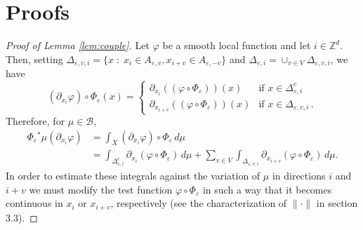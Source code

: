 \documentclass{amsart}
\numberwithin{equation}{section}
\begin{document}
\section{Proofs}\label{sec:proofs}
\begin{proof}[Proof of Lemma \ref{lem:couple}]
  Let ${\varphi}$ be a smooth local function and let $i\in{{\mathbb Z}}^d$.
  Then, setting $\Delta_{{\varepsilon},v,i}=\{x\;:\; x_i\in
  A_{{\varepsilon},v}, x_{i+v}\in A_{{\varepsilon},-v}\}$ and $\Delta_{{\varepsilon},i}=\cup_{v\in V}
  \Delta_{{\varepsilon},v,i}$, we have
  \begin{displaymath}
    ({\partial_{{x_i}}}{\varphi})\circ\Phi_{\varepsilon}(x)=
    \begin{cases}
      {\partial_{{x_i}}}\left(({\varphi}\circ\Phi_{\varepsilon})\right)(x)&\text{if
      }x\in\Delta_{{\varepsilon},i}^c\\
      {\partial_{{x_{i+v}}}}\left(({\varphi}\circ\Phi_{\varepsilon})\right)(x)&\text{if
      }x\in\Delta_{{\varepsilon},v,i} \,.
    \end{cases}
  \end{displaymath}
  Therefore, for $\mu\in {{\mathcal B}}$,
  \begin{equation}
    \label{eq:LY1}
    \begin{split}
      \Phi_{\varepsilon}{^*}\mu({\partial_{{x_i}}}{\varphi}) &=
      \int_X  ({\partial_{{x_i}}}{\varphi})\circ\Phi_{\varepsilon}\,d\mu\\
      &= \int_{\Delta_{{\varepsilon},i}^c} {\partial_{{x_i}}}({\varphi}\circ\Phi_{\varepsilon})\, d\mu +
      \sum_{v\in
        V}\int_{\Delta_{{\varepsilon},v,i}} {\partial_{{x_{i+v}}}}({\varphi}\circ\Phi_{\varepsilon})\,d\mu.
    \end{split}
  \end{equation}
  In order to estimate these integrals against the variation of $\mu$ in
  directions $i$ and $i+v$ we must modify the test function
  ${\varphi}\circ\Phi_{\varepsilon}$ in such a way that it becomes continuous in $x_i$ or
  $x_{i+v}$, respectively (see the characterization of $\|\cdot\|$ in \cite{kl-lecture} section
3.3).


\end{proof}
\end{document}

